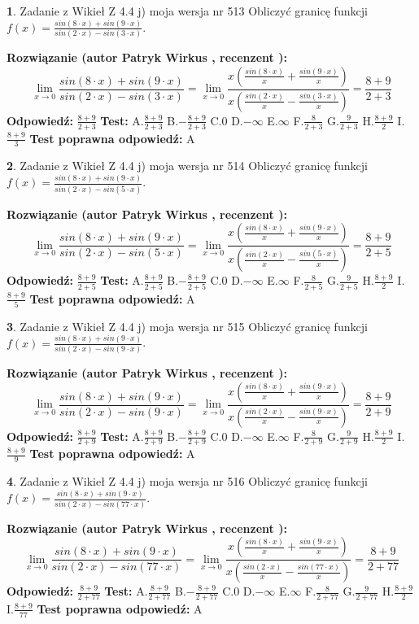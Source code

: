\documentclass[12pt, a4paper]{article}
\theoremstyle{definition} %
\newtheorem{zad}{}
\newcommand{\zadStart}[1]{\begin{zad}#1\newline}
\newcommand{\zadStop}{\end{zad}}
\newcommand{\rozwStart}[2]{\noindent \textbf{Rozwiązanie (autor #1 , recenzent #2): }\newline}
\newcommand{\rozwStop}{\newline}
\newcommand{\odpStart}{\noindent \textbf{Odpowiedź:}\newline}
\newcommand{\odpStop}{\newline}
\newcommand{\testStart}{\noindent \textbf{Test:}\newline}
\newcommand{\testStop}{\newline}
\newcommand{\kluczStart}{\noindent \textbf{Test poprawna odpowiedź:}\newline}
\newcommand{\kluczStop}{\newline}
\begin{document}
\zadStart{Zadanie z Wikieł Z 4.4 j) moja wersja nr 513}
Obliczyć granicę funkcji $f(x)=\frac{sin(8\cdot x) +sin(9\cdot x)}{sin(2\cdot x) -sin(3\cdot x)}$.
\zadStop
\rozwStart{Patryk Wirkus}{}
$$\lim\limits_{x\to 0}\frac{sin(8\cdot x) +sin(9\cdot x)}{sin(2\cdot x) -sin(3\cdot x)}=\lim\limits_{x\to 0}\frac{x(\frac{sin(8\cdot x)}{x}+\frac{sin(9\cdot x)}{x})}{x(\frac{sin(2\cdot x)}{x}-\frac{sin(3\cdot x)}{x})}=\frac{8+9}{2+3}$$
\rozwStop
\odpStart
$\frac{8+9}{2+3}$
\odpStop
\testStart
A.$\frac{8+9}{2+3}$
B.$-\frac{8+9}{2+3}$
C.$0$
D.$-\infty$
E.$\infty$
F.$\frac{8}{2+3}$
G.$\frac{9}{2+3}$
H.$\frac{8+9}{2}$
I.$\frac{8+9}{3}$
\testStop
\kluczStart
A
\kluczStop



\zadStart{Zadanie z Wikieł Z 4.4 j) moja wersja nr 514}
Obliczyć granicę funkcji $f(x)=\frac{sin(8\cdot x) +sin(9\cdot x)}{sin(2\cdot x) -sin(5\cdot x)}$.
\zadStop
\rozwStart{Patryk Wirkus}{}
$$\lim\limits_{x\to 0}\frac{sin(8\cdot x) +sin(9\cdot x)}{sin(2\cdot x) -sin(5\cdot x)}=\lim\limits_{x\to 0}\frac{x(\frac{sin(8\cdot x)}{x}+\frac{sin(9\cdot x)}{x})}{x(\frac{sin(2\cdot x)}{x}-\frac{sin(5\cdot x)}{x})}=\frac{8+9}{2+5}$$
\rozwStop
\odpStart
$\frac{8+9}{2+5}$
\odpStop
\testStart
A.$\frac{8+9}{2+5}$
B.$-\frac{8+9}{2+5}$
C.$0$
D.$-\infty$
E.$\infty$
F.$\frac{8}{2+5}$
G.$\frac{9}{2+5}$
H.$\frac{8+9}{2}$
I.$\frac{8+9}{5}$
\testStop
\kluczStart
A
\kluczStop



\zadStart{Zadanie z Wikieł Z 4.4 j) moja wersja nr 515}
Obliczyć granicę funkcji $f(x)=\frac{sin(8\cdot x) +sin(9\cdot x)}{sin(2\cdot x) -sin(9\cdot x)}$.
\zadStop
\rozwStart{Patryk Wirkus}{}
$$\lim\limits_{x\to 0}\frac{sin(8\cdot x) +sin(9\cdot x)}{sin(2\cdot x) -sin(9\cdot x)}=\lim\limits_{x\to 0}\frac{x(\frac{sin(8\cdot x)}{x}+\frac{sin(9\cdot x)}{x})}{x(\frac{sin(2\cdot x)}{x}-\frac{sin(9\cdot x)}{x})}=\frac{8+9}{2+9}$$
\rozwStop
\odpStart
$\frac{8+9}{2+9}$
\odpStop
\testStart
A.$\frac{8+9}{2+9}$
B.$-\frac{8+9}{2+9}$
C.$0$
D.$-\infty$
E.$\infty$
F.$\frac{8}{2+9}$
G.$\frac{9}{2+9}$
H.$\frac{8+9}{2}$
I.$\frac{8+9}{9}$
\testStop
\kluczStart
A
\kluczStop



\zadStart{Zadanie z Wikieł Z 4.4 j) moja wersja nr 516}
Obliczyć granicę funkcji $f(x)=\frac{sin(8\cdot x) +sin(9\cdot x)}{sin(2\cdot x) -sin(77\cdot x)}$.
\zadStop
\rozwStart{Patryk Wirkus}{}
$$\lim\limits_{x\to 0}\frac{sin(8\cdot x) +sin(9\cdot x)}{sin(2\cdot x) -sin(77\cdot x)}=\lim\limits_{x\to 0}\frac{x(\frac{sin(8\cdot x)}{x}+\frac{sin(9\cdot x)}{x})}{x(\frac{sin(2\cdot x)}{x}-\frac{sin(77\cdot x)}{x})}=\frac{8+9}{2+77}$$
\rozwStop
\odpStart
$\frac{8+9}{2+77}$
\odpStop
\testStart
A.$\frac{8+9}{2+77}$
B.$-\frac{8+9}{2+77}$
C.$0$
D.$-\infty$
E.$\infty$
F.$\frac{8}{2+77}$
G.$\frac{9}{2+77}$
H.$\frac{8+9}{2}$
I.$\frac{8+9}{77}$
\testStop
\kluczStart
A
\kluczStop
\end{document}
